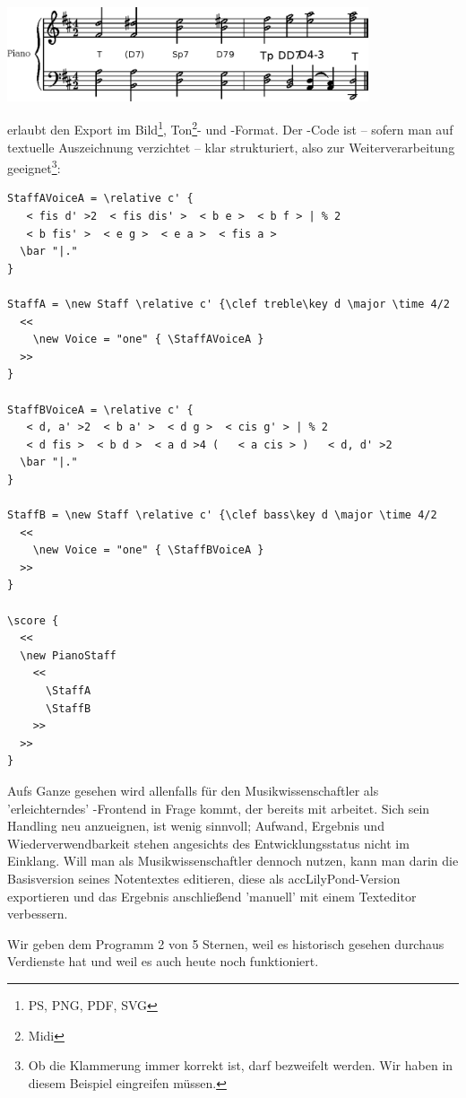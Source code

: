 \begin{center}
\includegraphics[width=0.8\textwidth]{frontends/nted/candenca2-ntd}
\end{center}

 erlaubt den Export im Bild\footnote{PS, PNG, PDF, SVG},
Ton\footnote{Midi}- und -Format. Der -Code ist --
sofern man auf textuelle Auszeichnung verzichtet -- klar strukturiert, also zur
Weiterverarbeitung geeignet\footnote{Ob die Klammerung immer korrekt ist, darf
bezweifelt werden. Wir haben in diesem Beispiel eingreifen müssen.}:

\begin{verbatim}
StaffAVoiceA = \relative c' {
   < fis d' >2  < fis dis' >  < b e >  < b f > | % 2
   < b fis' >  < e g >  < e a >  < fis a > 
  \bar "|."
}

StaffA = \new Staff \relative c' {\clef treble\key d \major \time 4/2
  <<
    \new Voice = "one" { \StaffAVoiceA } 
  >>
}

StaffBVoiceA = \relative c' {
   < d, a' >2  < b a' >  < d g >  < cis g' > | % 2
   < d fis >  < b d >  < a d >4 (   < a cis > )   < d, d' >2 
  \bar "|."
}

StaffB = \new Staff \relative c' {\clef bass\key d \major \time 4/2
  <<
    \new Voice = "one" { \StaffBVoiceA } 
  >>
}

\score {
  <<
  \new PianoStaff 
    <<
      \StaffA
      \StaffB
    >>
  >>
}

\end{verbatim}

Aufs Ganze gesehen wird  allenfalls für den Musikwissenschaftler als
'erleichterndes' -Frontend in Frage kommt, der bereits mit
 arbeitet. Sich sein Handling neu anzueignen, ist wenig sinnvoll;
Aufwand, Ergebnis und Wiederverwendbarkeit stehen angesichts des
Entwicklungsstatus nicht im Einklang. Will man als Musikwissenschaftler
 dennoch nutzen, kann man darin die Basisversion seines Notentextes
editieren, diese als acc{LilyPond}-Version exportieren und das Ergebnis
anschließend 'manuell' mit einem Texteditor verbessern.

Wir geben dem Programm 2 von 5 Sternen, weil es historisch gesehen durchaus
Verdienste hat und weil es auch heute noch funktioniert.


%
